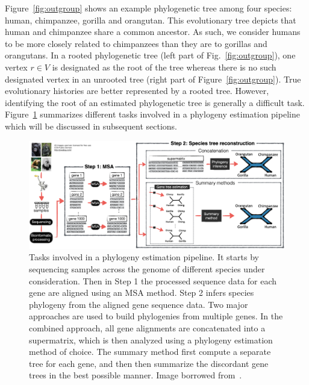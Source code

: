 Figure~\ref{fig:outgroup} shows an example phylogenetic tree among four species: human, chimpanzee, gorilla and orangutan. This evolutionary tree depicts that human and chimpanzee share a common ancestor. As such, we consider humans to be more closely related to chimpanzees than they are to gorillas and orangutans.
In a rooted phylogenetic tree (left part of Fig.~\ref{fig:outgroup}), one vertex $r \in V$ is designated as the root of the tree whereas there is no such designated vertex in an unrooted tree (right part of Figure~\ref{fig:outgroup}). True evolutionary histories are better represented by a rooted tree. However, identifying the root of an estimated phylogenetic tree is generally a difficult task. Figure~\ref{fig:phy-pipeline} summarizes different tasks involved in a phylogeny estimation pipeline which will be discussed in subsequent sections.

\begin{figure}[!htbp]
	\centering
	\includegraphics[width=1.0\textwidth]{Figure/phy-pipeline}
	\caption[Tasks involved in a phylogeny estimation pipeline.]{Tasks involved in a phylogeny estimation pipeline. It starts by sequencing samples across the genome of different species under consideration. Then in Step 1 the processed sequence data for each gene are aligned using an MSA method. Step 2 infers species phylogeny from the aligned gene sequence data. Two major approaches are used to build phylogenies from multiple genes. In the combined approach, all gene alignments are concatenated into a supermatrix, which is then analyzed using a phylogeny estimation method of choice. The summary method first compute a separate tree for each gene, and then then summarize the discordant gene trees in the best possible manner. Image borrowed from~\cite{mirarab2015novel}.}
	\label{fig:phy-pipeline}
	
\end{figure}

